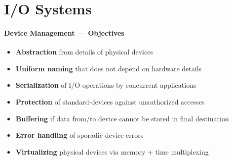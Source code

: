 \section{I/O Systems}

\paragraph{Device Management --- Objectives}
\begin{itemize}
  \item \textbf{Abstraction} from details of physical devices
  \item \textbf{Uniform naming} that does not depend on hardware details
  \item \textbf{Serialization} of I/O operations by concurrent applications
  \item \textbf{Protection} of standard-devices against unauthorized accesses
  \item \textbf{Buffering} if data from/to device cannot be stored in final destination
  \item \textbf{Error handling} of sporadic device errors
  \item \textbf{Virtualizing} physical devices via memory + time multiplexing
\end{itemize}

